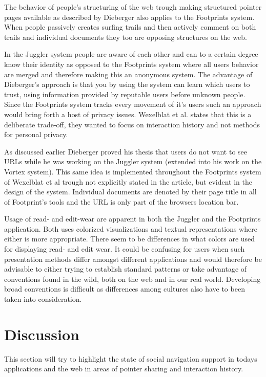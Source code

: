 \documentclass[12pt,a4paper]{article}
\begin{document}
The behavior of people's structuring of the web trough making structured
pointer pages available as described by Dieberger also applies to the
Footprints system. When people passively creates surfing trails and then
actively comment on both trails and individual documents they too are opposing
structures on the web.

In the Juggler system people are aware of each other and can to a certain
degree know their identity as opposed to the Footprints system where all users
behavior are merged and therefore making this an anonymous system. The
advantage of Dieberger's approach is that you by using the system can learn
which users to trust, using information provided by reputable users
before unknown people. Since the Footprints system tracks every movement of
it's users such an approach would bring forth a host of privacy issues.
Wexelblat et al. states that this is a deliberate trade-off, they wanted to
focus on interaction history and not methods for personal privacy.

As discussed earlier Dieberger proved his thesis that users do not want to see
URLs while he was working on the Juggler system (extended into his work on the
Vortex system). This same idea is implemented
throughout the Footprints system of Wexelblat et al
trough not explicitly stated in the article, but evident in the design
of the system. Individual documents are denoted by their page title in all of
Footprint's tools and the URL is only part of the browsers location bar.

Usage of read- and edit-wear are apparent in both the Juggler and the
Footprints application. Both uses colorized visualizations and textual
representations where either is more appropriate. There seem to be differences
in what colors are used for displaying read- and edit wear. It could be
confusing for users when such presentation methods differ amongst different
applications and would therefore be advisable to either trying to establish
standard patterns or take advantage of conventions found in the wild, both on
the web and in our real world. Developing broad conventions is difficult as
differences among cultures also have to been taken into consideration.

\section{Discussion}

This section will try to highlight the state of social navigation support in
todays applications and the web in areas of pointer sharing and interaction
history.
\end{document}
